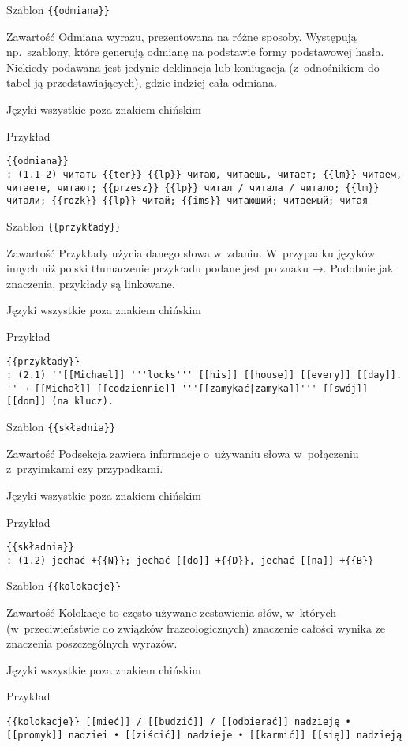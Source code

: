 \spacer
\begin{opis}
	\item[Szablon] \verb|{{odmiana}}|
	\item[Zawartość] Odmiana wyrazu, prezentowana na różne sposoby. Występują np.\ szablony, które generują odmianę na podstawie formy podstawowej hasła. Niekiedy podawana jest jedynie deklinacja lub koniugacja (z~odnośnikiem do tabel ją przedstawiających), gdzie indziej cała odmiana.
	\item[Języki] wszystkie poza znakiem chińskim
	\item[Przykład]
\begin{lstlisting}
{{odmiana}}
: (1.1-2) читать {{ter}} {{lp}} читаю, читаешь, читает; {{lm}} читаем, читаете, читают; {{przesz}} {{lp}} читал / читала / читало; {{lm}} читали; {{rozk}} {{lp}} читай; {{ims}} читающий; читаемый; читая
\end{lstlisting}
\end{opis}
\spacer
\begin{opis}
	\item[Szablon] \verb|{{przykłady}}|
	\item[Zawartość] Przykłady użycia danego słowa w~zdaniu. W~przypadku języków innych niż polski tłumaczenie przykładu podane jest po znaku →. Podobnie jak znaczenia, przykłady są linkowane.
	\item[Języki] wszystkie poza znakiem chińskim
	\item[Przykład]
\begin{lstlisting}
{{przykłady}}
: (2.1) ''[[Michael]] '''locks''' [[his]] [[house]] [[every]] [[day]]. '' → [[Michał]] [[codziennie]] '''[[zamykać|zamyka]]''' [[swój]] [[dom]] (na klucz).
\end{lstlisting}
\end{opis}
\spacer
\begin{opis}
	\item[Szablon] \verb|{{składnia}}|
	\item[Zawartość] Podsekcja zawiera informacje o~używaniu słowa w~połączeniu z~przyimkami czy przypadkami.
	\item[Języki] wszystkie poza znakiem chińskim
	\item[Przykład]
\begin{lstlisting}
{{składnia}}
: (1.2) jechać +{{N}}; jechać [[do]] +{{D}}, jechać [[na]] +{{B}}
\end{lstlisting}
\end{opis}
\spacer
\begin{opis}
	\item[Szablon] \verb|{{kolokacje}}|
	\item[Zawartość] Kolokacje to często używane zestawienia słów, w~których (w~przeciwieństwie do związków frazeologicznych) znaczenie całości wynika ze znaczenia poszczególnych wyrazów.
	\item[Języki] wszystkie poza znakiem chińskim
	\item[Przykład]
\begin{lstlisting}
{{kolokacje}} [[mieć]] / [[budzić]] / [[odbierać]] nadzieję • [[promyk]] nadziei • [[ziścić]] nadzieje • [[karmić]] [[się]] nadzieją
\end{lstlisting}
\end{opis}
